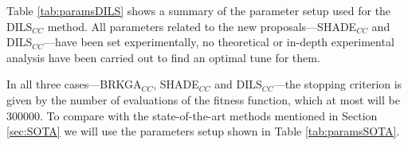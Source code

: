 Table \ref{tab:paramsDILS} shows a summary of the parameter setup used for the \acs{DILS}$_{CC}$ method. All parameters related to the new proposals---\acs{SHADE}$_{CC}$ and \acs{DILS}$_{CC}$---have been set experimentally, no theoretical or in-depth experimental analysis have been carried out to find an optimal tune for them.

\begin{table}[!h]
	\centering
	\setlength{\tabcolsep}{7pt}
	\renewcommand{\arraystretch}{1.4}
	
	\caption{Parameter setup used for \acs{DILS}$_{CC}$.}
	\label{tab:paramsDILS}
\end{table}

In all three cases---\acs{BRKGA}$_{CC}$, \acs{SHADE}$_{CC}$ and \acs{DILS}$_{CC}$---the stopping criterion is given by the number of evaluations of the fitness function, which at most will be 300000. To compare with the state-of-the-art methods mentioned in Section \ref{sec:SOTA} we will use the parameters setup shown in Table \ref{tab:paramsSOTA}.

\clearpage

